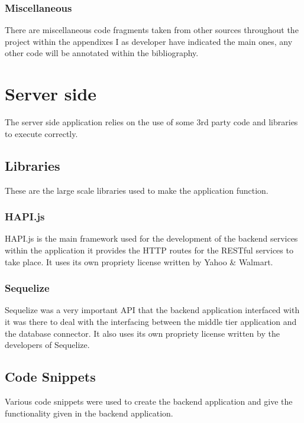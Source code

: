 \subsubsection{Miscellaneous}

There are miscellaneous code fragments taken from other sources throughout the project within the appendixes I as developer have indicated the main ones, any other code will be annotated within the bibliography.

\section{Server side}

The server side application relies on the use of some 3rd party code and libraries to execute correctly.

\subsection{Libraries}

These are the large scale libraries used to make the application function.

\subsubsection{HAPI.js}

HAPI.js \cite{hapiteam:hapti:2015:online} is the main framework used for the development of the backend services within the application it provides the HTTP routes for the RESTful services to take place. It uses its own propriety license written by Yahoo \& Walmart.

\subsubsection{Sequelize}

Sequelize was a very important API that the backend application interfaced with it was there to deal with the interfacing between the middle tier application and the database connector. It also uses its own propriety license written by the developers of Sequelize.

\subsection{Code Snippets}

Various code snippets were used to create the backend application and give the functionality given in the backend application.

